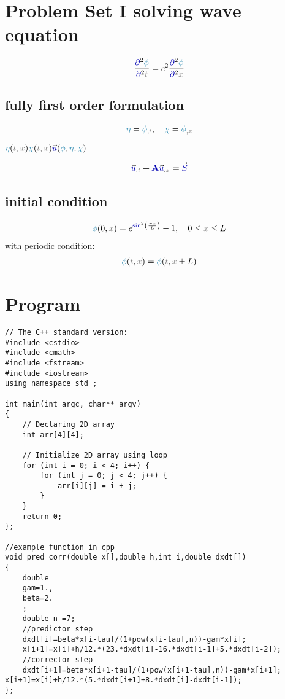 \documentclass[10pt,fleqn,reqno,a4paper]{article}
\begin{document}
\section{Problem Set I solving wave equation}

\begin{align}
	\frac{\opartial^2\nphi}{\opartial^2\ct} = c^2\frac{\opartial^2\nphi}{\opartial^2\cx}
\end{align}

\subsection{fully first order formulation}

\begin{align}
	\neta = \nphi_{,\ct}, \quad \nchi = \nphi_{,\cx}
\end{align}



$ \neta(\ct,\cx) \nchi(\ct,\cx) \vfu(\nphi,\neta,\nchi) $


\begin{align}
	\vfu_{,\ct}+\MA\vfu_{,\cx}=\vfS
\end{align}



\subsection{initial condition}

\begin{align}
	\nphi(0, \cx)=e^{\fsin^2\left(\frac{\pi \cx}{L}\right)} -1, \quad 0 \leq \cx \leq L
\end{align}
with periodic condition:
\begin{align}
	\nphi(\ct,\cx) = \nphi(\ct, \cx \pm L)
\end{align}


\section{Program}
\begin{verbatim}
// The C++ standard version:
#include <cstdio>
#include <cmath>
#include <fstream>
#include <iostream>
using namespace std ;

int main(int argc, char** argv)
{
	// Declaring 2D array
	int arr[4][4];

	// Initialize 2D array using loop
	for (int i = 0; i < 4; i++) {
		for (int j = 0; j < 4; j++) {
			arr[i][j] = i + j;
		}
	}
	return 0;
};

//example function in cpp
void pred_corr(double x[],double h,int i,double dxdt[])
{
	double
	gam=1.,
	beta=2.
	;
	double n =7;
	//predictor step
	dxdt[i]=beta*x[i-tau]/(1+pow(x[i-tau],n))-gam*x[i];
	x[i+1]=x[i]+h/12.*(23.*dxdt[i]-16.*dxdt[i-1]+5.*dxdt[i-2]);
	//corrector step
	dxdt[i+1]=beta*x[i+1-tau]/(1+pow(x[i+1-tau],n))-gam*x[i+1]; x[i+1]=x[i]+h/12.*(5.*dxdt[i+1]+8.*dxdt[i]-dxdt[i-1]);
};
\end{verbatim}
\end{document}
